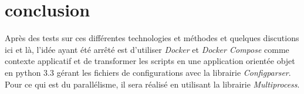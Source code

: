 \section{conclusion}
Après des tests sur ces différentes technologies et méthodes et quelques discutions ici et là, l'idée ayant été arrêté est d'utiliser \emph{Docker} et \emph{Docker Compose} comme contexte applicatif et de transformer les scripts en une application orientée objet en python 3.3 gérant les fichiers de configurations avec la librairie \emph{Configparser}. Pour ce qui est du parallélisme, il sera réalisé en utilisant la librairie \emph{Multiprocess}.
















